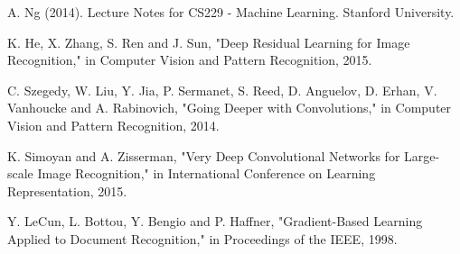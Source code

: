 \documentclass[conference]{IEEEtran}
\begin{document}
\begin{thebibliography}{99}
    A. Ng (2014). Lecture Notes for CS229 - Machine Learning. Stanford
    University.
    
    K. He, X. Zhang, S. Ren and J. Sun, "Deep Residual Learning for Image
    Recognition," in Computer Vision and Pattern Recognition, 2015.
    
    C. Szegedy, W. Liu, Y. Jia, P. Sermanet, S. Reed, D. Anguelov, D. Erhan,
    V. Vanhoucke and A. Rabinovich, "Going Deeper with Convolutions," in Computer Vision and Pattern Recognition, 2014.
    
    K. Simoyan and A. Zisserman, "Very Deep Convolutional Networks
    for Large-scale Image Recognition," in International Conference on Learning Representation, 2015.
    
    Y. LeCun, L. Bottou, Y. Bengio and P. Haffner, "Gradient-Based
    Learning Applied to Document Recognition," in Proceedings of the IEEE, 1998.
\end{thebibliography}
\vspace{12pt}
\color{red}
\end{document}
